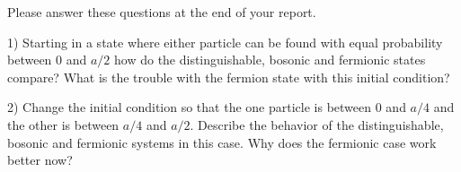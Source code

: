 \documentclass[11pt]{article} %
\begin{document}
Please answer these questions at the end of your report.

\bigskip

1) Starting in a state where either particle can be found with equal probability between $0$ and $a/2$ how do the distinguishable, bosonic and fermionic states compare? What is the trouble with the fermion state with this initial condition?

\bigskip

2) Change the initial condition so that the one particle is between $0$ and $a/4$ and the other is between $a/4$ and $a/2$. Describe the behavior of the distinguishable, bosonic and fermionic systems in this case. Why does the fermionic case work better now?

\bigskip
\end{document}
